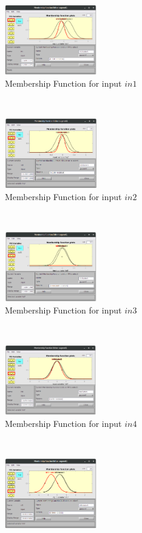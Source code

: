 \documentclass[11pt]{article}
\begin{document}
\begin{figure}[ht]
	\centering
	\begin{subfigure}[t]{0.3\textwidth}
		\centering
		\includegraphics[height=1.2in]{images/fcm_hybrid_in1}
		\caption{Membership Function for input $in1$}
	\end{subfigure}
	~ 
	\begin{subfigure}[t]{0.3\textwidth}
		\centering
		\includegraphics[height=1.2in]{images/fcm_hybrid_in2}
		\caption{Membership Function for input $in2$}
	\end{subfigure}
	~
	\begin{subfigure}[t]{0.3\textwidth}
		\centering
		\includegraphics[height=1.2in]{images/fcm_hybrid_in3}
		\caption{Membership Function for input $in3$}
	\end{subfigure}
	\\
	\begin{subfigure}[t]{0.3\textwidth}
		\centering
		\includegraphics[height=1.2in]{images/fcm_hybrid_in4}
		\caption{Membership Function for input $in4$}
	\end{subfigure}
	~ 
	\begin{subfigure}[t]{0.3\textwidth}
		\centering
		\includegraphics[height=1.2in]{images/fcm_hybrid_in5}

\end{subfigure}
\end{figure}
\end{document}
